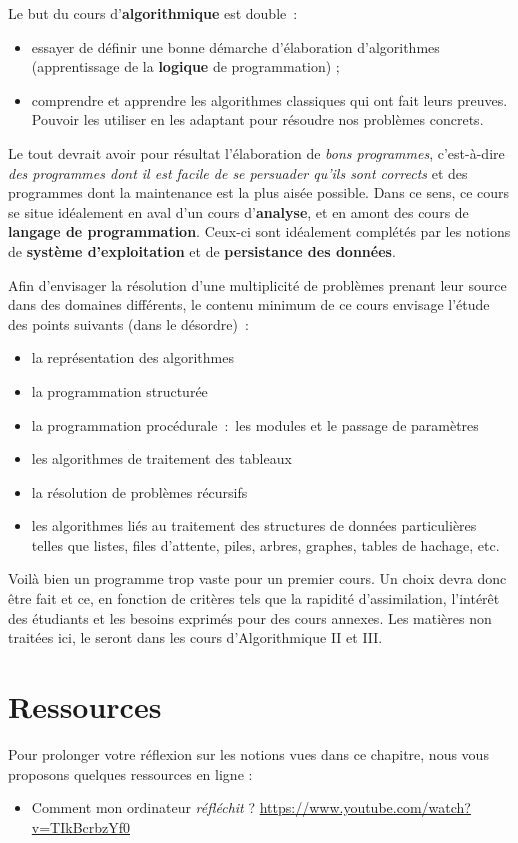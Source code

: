 		Le but du cours d'\textbf{algorithmique} est double~:
	
		\begin{itemize}
		\item
			essayer de définir une bonne démarche d’élaboration d’algorithmes
			(apprentissage de la \textbf{logique} de programmation) ;
		\item
			comprendre et apprendre les algorithmes classiques 
			qui ont fait leurs preuves.
			Pouvoir les utiliser en les adaptant 
			pour résoudre nos problèmes concrets.
		\end{itemize}
	
		Le tout devrait avoir pour résultat l’élaboration 
		de \textit{bons programmes}, 
		c’est-à-dire \textit{des programmes dont il est facile de
		se persuader qu’ils sont corrects} et des programmes dont la
		maintenance est la plus aisée possible. 
		Dans ce sens, ce cours se situe idéalement 
		en aval d’un cours d’\textbf{analyse}, 
		et en amont des cours de \textbf{langage de programmation}. 
		Ceux-ci sont idéalement complétés
		par les notions de \textbf{système d’exploitation} et de
		\textbf{persistance des données}.
	
		Afin d’envisager la résolution d’une multiplicité 
		de problèmes prenant leur source dans des domaines différents, 
		le contenu minimum de ce cours envisage l’étude des points suivants 
		(dans le désordre)~:
	
		\begin{itemize}
		\item 
			la représentation des algorithmes
		\item
			la programmation structurée
		\item
			la programmation procédurale~:~les modules et 
			le passage de paramètres
		\item
			les algorithmes de traitement des tableaux
		\item
			la résolution de problèmes récursifs
		\item
			les algorithmes liés au traitement des structures de données particulières telles
			que listes, files d’attente, piles, arbres, graphes, tables de hachage,
			etc.
		\end{itemize}
	
		Voilà bien un programme trop vaste pour un premier cours.  
		Un choix devra donc être fait et ce, en fonction
		de critères tels que la rapidité d’assimilation, l’intérêt des
		étudiants et les besoins exprimés pour des cours annexes. 
		Les matières non traitées ici, 
		le seront dans les cours d'Algorithmique II et III. 

	\section{Ressources}
	
		Pour prolonger votre réflexion 
		sur les notions vues dans ce chapitre, 
		nous vous proposons quelques ressources en ligne :
		\begin{itemize}
		\item
			Comment mon ordinateur \emph{réfléchit} ? 
			\url{https://www.youtube.com/watch?v=TIkBcrbzYf0}
		\end{itemize}
